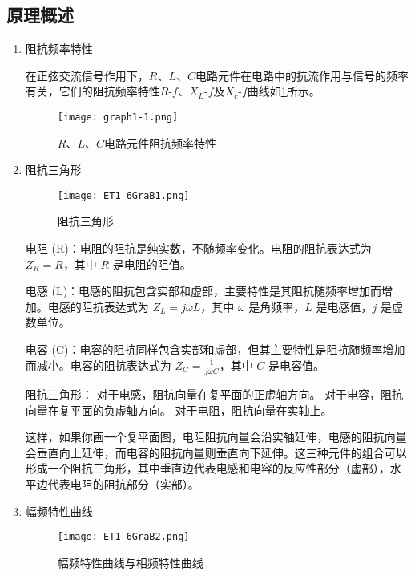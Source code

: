 \documentclass[dvipsnames, svgnames,a4paper,11pt]{article}
\begin{document}
	\subsection{原理概述}
	\begin{enumerate}
		\item 阻抗频率特性
		
		在正弦交流信号作用下，$R$、$L$、$C$电路元件在电路中的抗流作用与信号的频率有关，它们的阻抗频率特性$R$-$f$、$X_L$-$f$及$X_c$-$f$曲线如\cref{fig:graph1-1}所示。
		
		\begin{figure}[htbp]
			\centering
			\texttt{[image: graph1-1.png]}
			\caption{$R$、$L$、$C$电路元件阻抗频率特性}
			\label{fig:graph1-1}
		\end{figure}
		
		\item 阻抗三角形
		
		\begin{figure}[htbp]
			\centering
			\texttt{[image: ET1\_6GraB1.png]}
			\caption{阻抗三角形}
			\label{fig:figB1}
		\end{figure}
		
		电阻 (R)：电阻的阻抗是纯实数，不随频率变化。电阻的阻抗表达式为 \( Z_R = R \)，其中 \( R \) 是电阻的阻值。
		
		电感 (L)：电感的阻抗包含实部和虚部，主要特性是其阻抗随频率增加而增加。电感的阻抗表达式为 \( Z_L = j\omega L \)，其中 \( \omega \) 是角频率，\( L \) 是电感值，\( j \) 是虚数单位。
		
		电容 (C)：电容的阻抗同样包含实部和虚部，但其主要特性是阻抗随频率增加而减小。电容的阻抗表达式为 \( Z_C = \frac{1}{j\omega C} \)，其中 \( C \) 是电容值。
		
		阻抗三角形：
		对于电感，阻抗向量在复平面的正虚轴方向。
		对于电容，阻抗向量在复平面的负虚轴方向。
		对于电阻，阻抗向量在实轴上。
		
		这样，如果你画一个复平面图，电阻阻抗向量会沿实轴延伸，电感的阻抗向量会垂直向上延伸，而电容的阻抗向量则垂直向下延伸。这三种元件的组合可以形成一个阻抗三角形，其中垂直边代表电感和电容的反应性部分（虚部），水平边代表电阻的阻抗部分（实部）。
		
		\item 幅频特性曲线
		
		\begin{figure}[htbp]
			\centering
			\texttt{[image: ET1\_6GraB2.png]}
			\caption{幅频特性曲线与相频特性曲线}
			\label{fig:figB2}
		\end{figure}
		

\end{enumerate}
\end{document}
